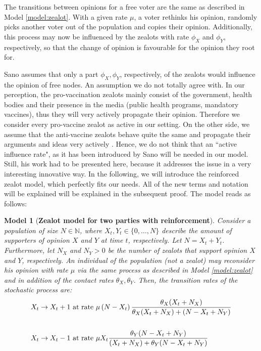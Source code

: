 \documentclass[12pt,a4paper,twoside]{article}
\newtheorem{model}{Model}[section]
\begin{document}
The transitions between opinions for a free voter are the same as described in Model \ref{model:zealot}. With a given rate $\mu$, a voter rethinks his opinion, randomly picks another voter out of the population and copies their opinion. Additionally, this process may now be influenced by the zealots with rate $\phi_X$ and $\phi_Y$, respectively, so that the change of opinion is favourable for the opinion they root for.

Sano assumes that only a part $\phi_X, \phi_Y$, respectively, of the zealots would influence the opinion of free nodes. An assumption we do not totally agree with. In our perception, the pro-vaccination zealots mainly consist of the government, health bodies and their presence in the media (public health programs, mandatory vaccines), thus they will very actively propagate their opinion. Therefore we consider every pro-vaccine zealot as active in our setting. On the other side, we assume that the anti-vaccine zealots behave quite the same and propagate their arguments and ideas very actively \cite{Davies2002, Meyer2004}. Hence, we do not think that an ``active influence rate", as it has been introduced by Sano will be needed in our model. Still, his work had to be presented here, because it addresses the issue in a very interesting innovative way. In the following, we will introduce the reinforced zealot model, which perfectly fits our needs. All of the new terms and notation will be explained will be explained in the subsequent proof. The model reads as follows:
\begin{model}[\textbf{Zealot model for two parties with reinforcement}]\label{model:zealot_reinforcement}%
	Consider a population of size $N \in \mathbb{N}$, where $X_t, Y_t \in \lbrace 0,\dots, N\rbrace$ describe the amount of supporters of opinion $X$ and $Y$ at time $t$, respectively. Let $N = X_t + Y_t$. Furthermore, let $N_X$ and $N_Y > 0$ be the number of zealots that support opinion $X$ and $Y$, respectively. An individual of the population (not a zealot) may reconsider his opinion with rate $\mu$ via the same process as described in Model \ref{model:zealot} and in addition of the contact rates $\theta_X, \theta_Y$. Then, the transition rates of the stochastic process are:
	\begin{align}\label{def:transition_rates_zealot_reinforcement}
	\begin{split}
	X_t \rightarrow X_t + 1 & \textnormal{ at rate } \mu\left(N-X_t\right)\frac{\theta_X (X_t + N_X)}{\theta_X (X_t + N_X) + (N - X_t + N_Y)} \\
	&\\
	X_t \rightarrow X_t - 1 & \textnormal{ at rate } \mu X_t\frac{\theta_Y(N-X_t+N_Y)}{(X_t + N_X) + \theta_Y(N-X_t+N_Y)}
	\end{split}
	\end{align}
\end{model}
\end{document}
